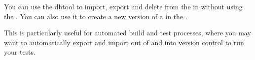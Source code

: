 You can use the dbtool to import, export and delete \gdprojects{} from the \gddb{} in without using the \ite{}. You can also use it to create a new version of a \gdproject{} in the \gddb{}.

This is particularly useful for automated build and test processes, where you may want to automatically export and import \gdprojects{} out of and into version control to run your tests. 
